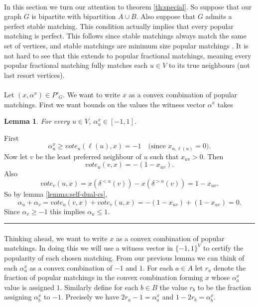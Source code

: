 \documentclass[letterpaper,12pt,oneside,onecolumn]{article}
\newenvironment{proof}{{\bf Proof:  }}{\hfill\rule{2mm}{2mm}}
\newtheorem{lemma}[fact]{Lemma}
\begin{document}
\paragraph{}
In this section we turn our attention to theorem \ref{th:special}. So suppose that our graph $G$ is bipartite with bipartition $A \cup B$. Also suppose that $G$ admits a perfect stable matching. This condition actually implies that every popular matching is perfect. This follows since stable matchings always match the same set of vertices, and stable matchings are minimum size popular matchings \cite{huang2011popular}. It is not hard to see that this extends to popular fractional matchings, meaning every popular fractional matching fully matches each $u \in V$ to its true neighbours (not last resort vertices). 
\paragraph{}
Let $(x, \alpha^x) \in P'_G$. We want to write $x$ as a convex combination of popular matchings. First we want bounds on the values the witness vector $\alpha^x$ takes
\begin{lemma}
For every $u \in V$, $\alpha_u^x \in [-1,1]$.
\end{lemma}
\begin{proof}First
$$\alpha^x_u \geq vote_u(\ell(u), x) = -1 \quad\text{(since }x_{u,\ell(u)} = 0\text{).}$$
Now let $v$ be the least preferred neighbour of $u$ such that $x_{uv} >0$. Then
$$vote_u(v,x) = -(1-x_{uv}).$$
Also
$$vote_v(u,x) = x(\delta^{<u}(v))-x(\delta^{>u}(v))= 1-x_{uv}.$$
So by lemma \ref{lemma:self-dual-cs},
$$\alpha_u + \alpha_v = vote_u(v,x) + vote_v(u,x) = -(1-x_{uv}) + (1-x_{uv}) = 0.$$
Since $\alpha_v \geq -1$ this implies $\alpha_u \leq 1$.
\end{proof}
\paragraph{}
Thinking ahead, we want to write $x$ as a convex combination of popular matchings. In doing this we will use a witness vector in $\{-1,1\}^V$ to certify the popularity of each chosen matching. From our previous lemma we can think of each $\alpha^x_u$ as a convex combination of $-1$ and $1$. For each $a \in A$ let $r_a$ denote the fraction of popular matchings in the convex combination forming $x$ whose $\alpha_a^x$ value is assigned $1$. Similarly define for each $b \in B$ the value $r_b$ to be the fraction assigning $\alpha^x_b$ to $-1$. Precisely we have $2r_a -1 = \alpha^x_a$ and $1-2r_b = \alpha^x_b$.
\end{document}
